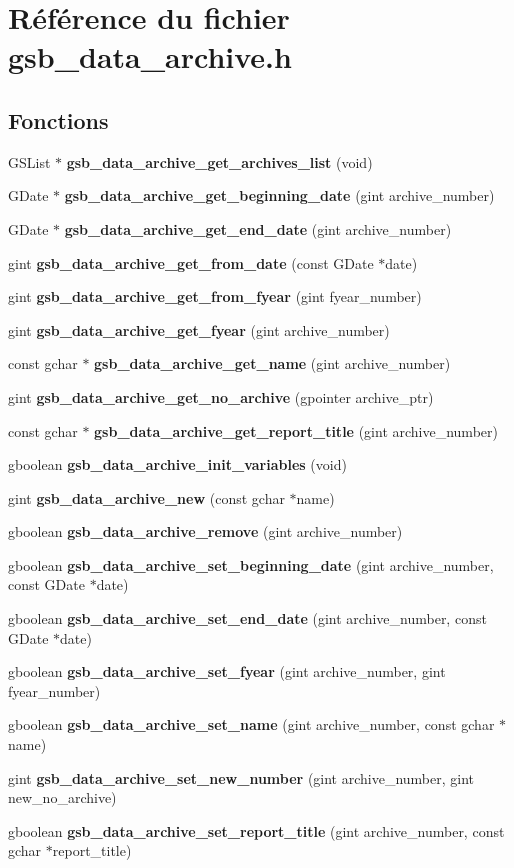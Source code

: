 \section{Référence du fichier gsb\_\-data\_\-archive.h}
\label{gsb__data__archive_8h}
\subsection*{Fonctions}
\begin{DoxyCompactItemize}
\item 
GSList $\ast$ {\bf gsb\_\-data\_\-archive\_\-get\_\-archives\_\-list} (void)
\item 
GDate $\ast$ {\bf gsb\_\-data\_\-archive\_\-get\_\-beginning\_\-date} (gint archive\_\-number)
\item 
GDate $\ast$ {\bf gsb\_\-data\_\-archive\_\-get\_\-end\_\-date} (gint archive\_\-number)
\item 
gint {\bf gsb\_\-data\_\-archive\_\-get\_\-from\_\-date} (const GDate $\ast$date)
\item 
gint {\bf gsb\_\-data\_\-archive\_\-get\_\-from\_\-fyear} (gint fyear\_\-number)
\item 
gint {\bf gsb\_\-data\_\-archive\_\-get\_\-fyear} (gint archive\_\-number)
\item 
const gchar $\ast$ {\bf gsb\_\-data\_\-archive\_\-get\_\-name} (gint archive\_\-number)
\item 
gint {\bf gsb\_\-data\_\-archive\_\-get\_\-no\_\-archive} (gpointer archive\_\-ptr)
\item 
const gchar $\ast$ {\bf gsb\_\-data\_\-archive\_\-get\_\-report\_\-title} (gint archive\_\-number)
\item 
gboolean {\bf gsb\_\-data\_\-archive\_\-init\_\-variables} (void)
\item 
gint {\bf gsb\_\-data\_\-archive\_\-new} (const gchar $\ast$name)
\item 
gboolean {\bf gsb\_\-data\_\-archive\_\-remove} (gint archive\_\-number)
\item 
gboolean {\bf gsb\_\-data\_\-archive\_\-set\_\-beginning\_\-date} (gint archive\_\-number, const GDate $\ast$date)
\item 
gboolean {\bf gsb\_\-data\_\-archive\_\-set\_\-end\_\-date} (gint archive\_\-number, const GDate $\ast$date)
\item 
gboolean {\bf gsb\_\-data\_\-archive\_\-set\_\-fyear} (gint archive\_\-number, gint fyear\_\-number)
\item 
gboolean {\bf gsb\_\-data\_\-archive\_\-set\_\-name} (gint archive\_\-number, const gchar $\ast$name)
\item 
gint {\bf gsb\_\-data\_\-archive\_\-set\_\-new\_\-number} (gint archive\_\-number, gint new\_\-no\_\-archive)
\item 
gboolean {\bf gsb\_\-data\_\-archive\_\-set\_\-report\_\-title} (gint archive\_\-number, const gchar $\ast$report\_\-title)
\end{DoxyCompactItemize}


